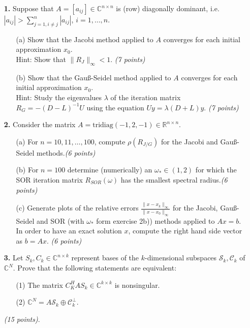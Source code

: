 \documentclass[10pt]{report}
\begin{document}
\begin{enumerate}
    
  \item[\textbf{1.}]Suppose that $A=[a_{ij}]\in\mathbb{C}^{n\times n}$ is  (row) diagonally dominant, i.e. $|a_{ij}|>\sum_{j=1,i\neq j}^n|a_{ij}|$, $i=1,\ldots,n$.
  \begin{enumerate}
    \item[(a)] Show that the Jacobi method applied to $A$ converges for each
    initial approximation $x_0$.\\ 
    Hint: Show that $\|R_J\|_{\infty}<1$. \textit{(7 points)}

    \item[(b)] Show that the Gau\ss-Seidel method applied to $A$ converges for
      each initial approximation $x_0$.\\ 
      Hint: Study the eigenvalues $\lambda$ of the iteration matrix
      $R_G=-(D-L)^{-1}U$ using the equation $Uy=\lambda(D+L)y$. 
      \textit{(7 points)}
  \end{enumerate}

\vspace{0.1cm} 

\item[\textbf{2.}] Consider the matrix $A=\text{tridiag}(-1,2,-1)\in\mathbb{R}^{n\times n}$.
  \begin{enumerate}
    \item[(a)] For  $n=10,11,\ldots,100$, compute $\rho(R_{J/G})$ for the Jacobi and Gau\ss-Seidel methods.\textit{(6 points)}

    \item[(b)] For $n=100$ determine (numerically) an $\omega_*\in(1,2)$ for which the SOR iteration matrix $R_{SOR}(\omega)$ has the smallest spectral radius.\textit{(6 points)}

    \item[(c)] Generate plots of the relative errors $\frac{\|x-x_k\|_{\infty}}{\|x-x_0\|_{\infty}}$ for the Jacobi, Gau\ss-Seidel and SOR (with $\omega_*$ form exercise 2b)) methods applied to $Ax=b$. In order to have an exact solution $x$, compute the right hand side vector as $b=Ax$.  \textit{(6 points)} 
    \end{enumerate}

\vspace{0.1cm} 

\item[\textbf{3.}] Let $S_k,C_k\in\mathbb{C}^{n\times k}$ represent bases of the $k$-dimensional subspaces $\mathcal{S}_k,\mathcal{C}_k$ of $\mathbb{C}^N$. Prove that the following statements are equivalent:
\begin{enumerate}
  \item[(1)] The matrix $C_K^HAS_k\in\mathbb{C}^{k\times k}$ is nonsingular.
  \item[(2)] $\mathbb{C}^{N}=A\mathcal{S}_k\oplus\mathcal{C}_k^\perp$.
\end{enumerate}
\textit{(15 points)}. 
\vspace{0.1cm} 


\end{enumerate}
\end{document}
